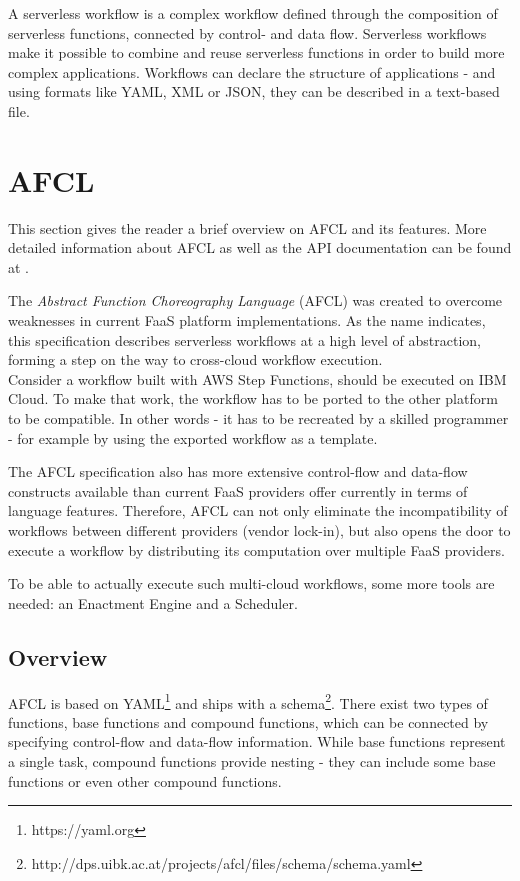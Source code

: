 \documentclass[a4paper,top=25mm,bottom=25mm,12pt,pdftex,halfparskip,twoside,bibtotoc,numbers=noenddot]{scrbook}
\begin{document}
A serverless workflow is a complex workflow defined through the composition of serverless functions, connected by control- and data flow. Serverless workflows make it possible to combine and reuse serverless functions in order to build more complex applications. 
Workflows can declare the structure of applications - and using formats like YAML, XML or JSON, they can be described in a text-based file.

\section{AFCL}

This section gives the reader a brief overview on AFCL and its features. More detailed information about AFCL as well as the API documentation can be found at \cite{online-afcl-dps}.

The \emph{Abstract Function Choreography Language} (AFCL) was created to overcome weaknesses in current FaaS platform implementations. As the name indicates, this specification describes serverless workflows at a high level of abstraction, forming a step on the way to cross-cloud workflow execution.\\
Consider a workflow built with AWS Step Functions, should be executed on IBM Cloud. To make that work, the workflow has to be ported to the other platform to be compatible. In other words - it has to be recreated by a skilled programmer - for example by using the exported workflow as a template.

The AFCL specification also has more extensive control-flow and data-flow constructs available than current FaaS providers offer currently in terms of language features. Therefore, AFCL can not only eliminate the incompatibility of workflows between different providers (vendor lock-in), but also opens the door to execute a workflow by distributing its computation over multiple FaaS providers.

To be able to actually execute such multi-cloud workflows, some more tools are needed: an Enactment Engine and a Scheduler.

\subsection{Overview}
AFCL is based on YAML\footnote{https://yaml.org} and ships with a schema\footnote{http://dps.uibk.ac.at/projects/afcl/files/schema/schema.yaml}. There exist two types of functions, base functions and compound functions, which can be connected by specifying control-flow and data-flow information. While base functions represent a single task, compound functions provide nesting - they can include some base functions or even other compound functions.
\end{document}
